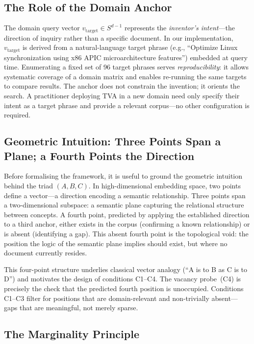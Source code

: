 \documentclass[11pt,twocolumn]{article}
\newcommand{\vtarget}{v_{\mathrm{target}}}
\begin{document}
\subsection{The Role of the Domain Anchor}

The domain query vector $\vtarget \in S^{d-1}$ represents the
\emph{inventor's intent}---the direction of inquiry rather than
a specific document.  In our implementation, $\vtarget$ is derived
from a natural-language target phrase (e.g., ``Optimize Linux
synchronization using x86 APIC microarchitecture features'')
embedded at query time.  Enumerating a fixed set of 96 target
phrases serves \emph{reproducibility}: it allows systematic
coverage of a domain matrix and enables re-running the same
targets to compare results.  The anchor does not constrain the
invention; it orients the search.  A practitioner deploying TVA
in a new domain need only specify their intent as a target phrase
and provide a relevant corpus---no other configuration is required.

\subsection{Geometric Intuition: Three Points Span a Plane; a Fourth Points the Direction}

Before formalising the framework, it is useful to ground the geometric
intuition behind the triad $(A, B, C)$.  In high-dimensional embedding
space, two points define a vector---a direction encoding a semantic
relationship.  Three points span a two-dimensional subspace: a semantic
plane capturing the relational structure between concepts.  A fourth
point, predicted by applying the established direction to a third anchor,
either exists in the corpus (confirming a known relationship) or is
absent (identifying a gap).  This absent fourth point is the topological
void: the position the logic of the semantic plane implies should exist,
but where no document currently resides.

This four-point structure underlies classical vector analogy
(``A is to B as C is to D'') and motivates the design of conditions
C1--C4.  The vacancy probe~(C4) is precisely the check that the
predicted fourth position is unoccupied.  Conditions C1--C3 filter for
positions that are domain-relevant and non-trivially absent---gaps that
are meaningful, not merely sparse.

\subsection{The Marginality Principle}
\end{document}

